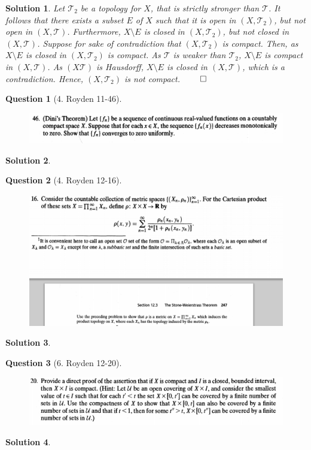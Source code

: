 \documentclass{article} %
\theoremstyle{quest}
\newtheorem*{question}{Question}
\newtheorem*{solution}{Solution}
\begin{document}
\begin{solution}
\smallskip
 
Let $\mathscr{T}_2$ be a topology for $X$, that is strictly stronger than
$\mathscr{T}$. It follows that there exists a subset $E$ of $X$ such that
it is open in $(X,\mathscr{T}_2)$, but not open in $(X,\mathscr{T})$. 
Furthermore, $X\setminus E$ is closed in $(X,\mathscr{T}_2)$, but not
closed in $(X,\mathscr{T})$. Suppose for sake of contradiction that 
$(X,\mathscr{T}_2)$ is compact. Then, as $X \setminus E$ is closed in $(X,
\mathscr{T}_2)$ is compact. As $\mathscr{T}$ is weaker than 
$\mathscr{T}_2$, $X \setminus E$ is compact in $(X,\mathscr{T})$. As
$(X\mathscr{T})$ is Hausdorff, $X\setminus E$ is closed in $(X,\mathscr{T})$,
which is a contradiction. Hence, $(X,\mathscr{T}_2)$ is not compact. 
\hfill $\qed$ 
\end{solution}

\newpage

\begin{question}[4. Royden 11-46]
\hfill
\begin{figure}[h!]
  \centering
    \includegraphics[width=1\textwidth]{11-46}
\end{figure}
\end{question}
\begin{solution}

\end{solution}

\pagebreak

\begin{question}[4. Royden 12-16]
\hfill
\begin{figure}[h!]
  \centering
    \includegraphics[width=1\textwidth]{12-16}
\end{figure}
\end{question}
\begin{solution}
\end{solution}

\pagebreak

\begin{question}[6. Royden 12-20]
\hfill
\begin{figure}[h!]
  \centering
    \includegraphics[width=1\textwidth]{12-20}
\end{figure}
\end{question}
\begin{solution}
\end{solution}
\end{document}

